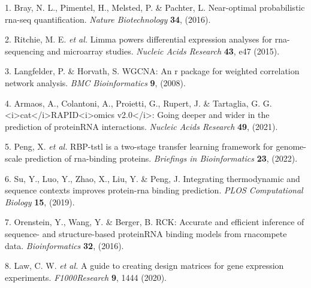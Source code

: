 \documentclass[
]{article}
\newenvironment{cslreferences}%
  {}%
  {\par}
\begin{document}
\hypertarget{refs}{}
\begin{cslreferences}
\leavevmode\hypertarget{ref-NearOptimalPrBray2016}{}%
1. Bray, N. L., Pimentel, H., Melsted, P. \& Pachter, L. Near-optimal probabilistic rna-seq quantification. \emph{Nature Biotechnology} \textbf{34}, (2016).

\leavevmode\hypertarget{ref-LimmaPowersDiRitchi2015}{}%
2. Ritchie, M. E. \emph{et al.} Limma powers differential expression analyses for rna-sequencing and microarray studies. \emph{Nucleic Acids Research} \textbf{43}, e47 (2015).

\leavevmode\hypertarget{ref-WgcnaAnRPacLangfe2008}{}%
3. Langfelder, P. \& Horvath, S. WGCNA: An r package for weighted correlation network analysis. \emph{BMC Bioinformatics} \textbf{9}, (2008).

\leavevmode\hypertarget{ref-ICatIRapidArmaos2021}{}%
4. Armaos, A., Colantoni, A., Proietti, G., Rupert, J. \& Tartaglia, G. G. \textless i\textgreater cat\textless/i\textgreater RAPID\textless i\textgreater omics v2.0\textless/i\textgreater: Going deeper and wider in the prediction of proteinRNA interactions. \emph{Nucleic Acids Research} \textbf{49}, (2021).

\leavevmode\hypertarget{ref-RbpTstlIsATPeng2022}{}%
5. Peng, X. \emph{et al.} RBP-tstl is a two-stage transfer learning framework for genome-scale prediction of rna-binding proteins. \emph{Briefings in Bioinformatics} \textbf{23}, (2022).

\leavevmode\hypertarget{ref-IntegratingTheSuYu2019}{}%
6. Su, Y., Luo, Y., Zhao, X., Liu, Y. \& Peng, J. Integrating thermodynamic and sequence contexts improves protein-rna binding prediction. \emph{PLOS Computational Biology} \textbf{15}, (2019).

\leavevmode\hypertarget{ref-RckAccurateAOrenst2016}{}%
7. Orenstein, Y., Wang, Y. \& Berger, B. RCK: Accurate and efficient inference of sequence- and structure-based proteinRNA binding models from rnacompete data. \emph{Bioinformatics} \textbf{32}, (2016).

\leavevmode\hypertarget{ref-AGuideToCreaLawC2020}{}%
8. Law, C. W. \emph{et al.} A guide to creating design matrices for gene expression experiments. \emph{F1000Research} \textbf{9}, 1444 (2020).
\end{cslreferences}
\end{document}
